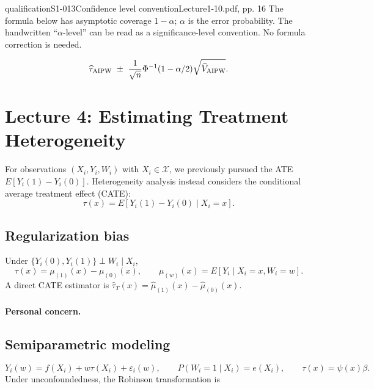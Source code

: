\begin{reviewnote}{qualification}{S1-013}{Confidence level convention}{Lecture1-10.pdf, pp. 16}
The formula below has asymptotic coverage $1-\alpha$; $\alpha$ is the error probability. The handwritten ``$\alpha$-level'' can be read as a significance-level convention. No formula correction is needed.
\end{reviewnote}

\[
\widehat\tau_{\rm AIPW}\ \pm\ \frac1{\sqrt n}\Phi^{-1}(1-\alpha/2)\sqrt{\widehat V_{\rm AIPW}}.
\]

\section{Lecture 4: Estimating Treatment Heterogeneity}
For observations $(X_i,Y_i,W_i)$ with $X_i\in\mathcal X$, we previously pursued the ATE $E[Y_i(1)-Y_i(0)]$. Heterogeneity analysis instead considers the conditional average treatment effect (CATE):
\[
\tau(x)=E[Y_i(1)-Y_i(0)\mid X_i=x].
\]
\subsection{Regularization bias}
Under $\{Y_i(0),Y_i(1)\}\perp W_i\mid X_i$,
\[
\tau(x)=\mu_{(1)}(x)-\mu_{(0)}(x),\qquad
\mu_{(w)}(x)=E[Y_i\mid X_i=x,W_i=w].
\]
A direct CATE estimator is $\widehat\tau_T(x)=\widehat\mu_{(1)}(x)-\widehat\mu_{(0)}(x)$.
\paragraph{Personal concern.}
\subsection{Semiparametric modeling}
\[
Y_i(w)=f(X_i)+w\tau(X_i)+\varepsilon_i(w),\qquad
P(W_i=1\mid X_i)=e(X_i),\qquad \tau(x)=\psi(x)\beta.
\]
 Under unconfoundedness, the Robinson transformation is

